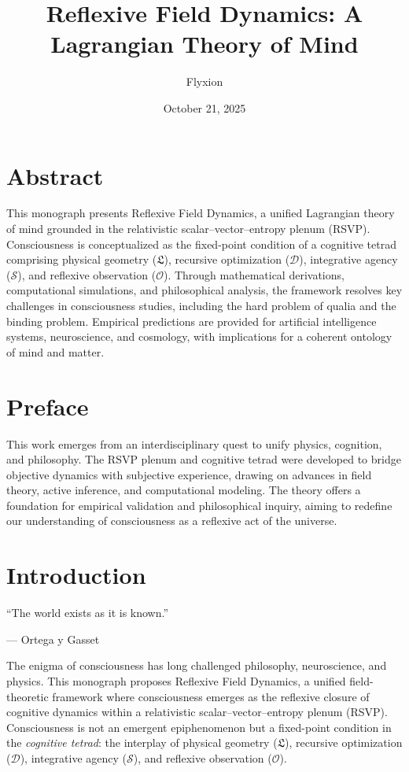 \documentclass[12pt]{book}
\title{\textbf{Reflexive Field Dynamics: A Lagrangian Theory of Mind}}
\author{Flyxion}
\date{October 21, 2025}
\theoremstyle{definition}
\begin{document}
\maketitle
\tableofcontents

\chapter*{Abstract}

This monograph presents Reflexive Field Dynamics, a unified Lagrangian theory of mind grounded in the relativistic scalar–vector–entropy plenum (RSVP). Consciousness is conceptualized as the fixed-point condition of a cognitive tetrad comprising physical geometry ($\mathfrak{L}$), recursive optimization ($\mathcal{D}$), integrative agency ($\mathcal{S}$), and reflexive observation ($\mathcal{O}$). Through mathematical derivations, computational simulations, and philosophical analysis, the framework resolves key challenges in consciousness studies, including the hard problem of qualia and the binding problem. Empirical predictions are provided for artificial intelligence systems, neuroscience, and cosmology, with implications for a coherent ontology of mind and matter.

\chapter*{Preface}

This work emerges from an interdisciplinary quest to unify physics, cognition, and philosophy. The RSVP plenum and cognitive tetrad were developed to bridge objective dynamics with subjective experience, drawing on advances in field theory, active inference, and computational modeling. The theory offers a foundation for empirical validation and philosophical inquiry, aiming to redefine our understanding of consciousness as a reflexive act of the universe.

\chapter{Introduction}
\epigraph{``The world exists as it is known.''}{--- Ortega y Gasset}

The enigma of consciousness has long challenged philosophy, neuroscience, and physics. This monograph proposes Reflexive Field Dynamics, a unified field-theoretic framework where consciousness emerges as the reflexive closure of cognitive dynamics within a relativistic scalar–vector–entropy plenum (RSVP). Consciousness is not an emergent epiphenomenon but a fixed-point condition in the \emph{cognitive tetrad}: the interplay of physical geometry ($\mathfrak{L}$), recursive optimization ($\mathcal{D}$), integrative agency ($\mathcal{S}$), and reflexive observation ($\mathcal{O}$).
\end{document}
